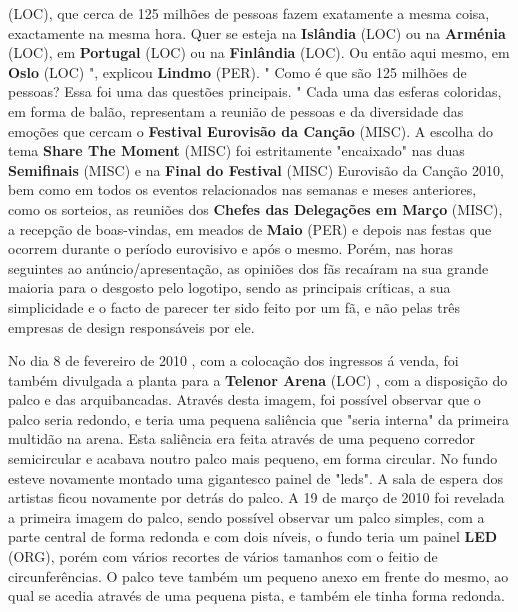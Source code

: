 \documentclass[12pt,a4paper]{article}
\begin{document}
(LOC), que cerca de 125 milhões de pessoas fazem exatamente a mesma coisa, exactamente na mesma hora. Quer se esteja na \textbf{Islândia} (LOC) ou na \textbf{Arménia} (LOC), em \textbf{Portugal} (LOC) ou na \textbf{Finlândia} (LOC). Ou então aqui mesmo, em \textbf{Oslo} (LOC) ", explicou \textbf{Lindmo} (PER). " Como é que são 125 milhões de pessoas? Essa foi uma das questões principais. " Cada uma das esferas coloridas, em forma de balão, representam a reunião de pessoas e da diversidade das emoções que cercam o \textbf{Festival Eurovisão da Canção} (MISC). A escolha do tema \textbf{Share The Moment} (MISC) foi estritamente "encaixado" nas duas \textbf{Semifinais} (MISC) e na \textbf{Final do Festival} (MISC) Eurovisão da Canção 2010, bem como em todos os eventos relacionados nas semanas e meses anteriores, como os sorteios, as reuniões dos \textbf{Chefes das Delegações em Março} (MISC), a recepção de boas-vindas, em meados de \textbf{Maio} (PER) e depois nas festas que ocorrem durante o período eurovisivo e após o mesmo. Porém, nas horas seguintes ao anúncio/apresentação, as opiniões dos fãs recaíram na sua grande maioria para o desgosto pelo logotipo, sendo as principais críticas, a sua simplicidade e o facto de parecer ter sido feito por um fã, e não pelas três empresas de design responsáveis por ele.

No dia 8 de fevereiro de 2010 , com a colocação dos ingressos á venda, foi também divulgada a planta para a \textbf{Telenor Arena} (LOC) , com a disposição do palco e das arquibancadas. Através desta imagem, foi possível observar que o palco seria redondo, e teria uma pequena saliência que "seria interna" da primeira multidão na arena. Esta saliência era feita através de uma pequeno corredor semicircular e acabava noutro palco mais pequeno, em forma circular. No fundo esteve novamente montado uma gigantesco painel de "leds". A sala de espera dos artistas ficou novamente por detrás do palco. A 19 de março de 2010 foi revelada a primeira imagem do palco, sendo possível observar um palco simples, com a parte central de forma redonda e com dois níveis, o fundo teria um painel \textbf{LED} (ORG), porém com vários recortes de vários tamanhos com o feitio de circunferências. O palco teve também um pequeno anexo em frente do mesmo, ao qual se acedia através de uma pequena pista, e também ele tinha forma redonda.
\end{document}
